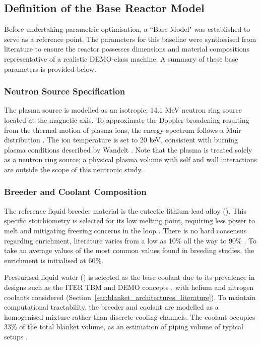 \documentclass[12pt]{article}
\begin{document}
\subsection{Definition of the Base Reactor Model}

Before undertaking parametric optimisation, a ``Base Model" was established to serve as a reference
point. The parameters for this baseline were synthesised from literature to ensure the reactor
possesses dimensions and material compositions representative of a realistic DEMO-class machine. A
summary of these base parameters is provided below.

\subsubsection{Neutron Source Specification}
The plasma source is modelled as an isotropic, 14.1 MeV neutron ring source located at the magnetic
axis. To approximate the Doppler broadening resulting from the thermal motion of plasma ions, the
energy spectrum follows a Muir distribution \cite{muir_sensitivity_1974}. The ion temperature is set
to 20 keV, consistent with burning plasma conditions described by Wandelt
\cite{wandelt_encyclopedia_2018}. Note that the plasma is treated solely as a neutron ring source; a
physical plasma volume with self and wall interactions are outside the scope of this neutronic
study.

\subsubsection{Breeder and Coolant Composition}
\label{sec:base_compositions}
The reference liquid breeder material is the eutectic lithium-lead alloy (). This
specific stoichiometry is selected for its low melting point, requiring less power to melt and
mitigating freezing concerns in the loop \cite{mas_de_les_valls_leadlithium_2008}. There is no hard
consensus regarding  enrichment, literature varies from a low as 10\% all the way to 90\%
\cite{hernandez_first_2018,boullon_molten_2021,segantin_optimisation_2020,segantin_neutronic_2020,kurasawa_ceramic_1995}.
To take an average values of the most common values found in breeding studies, the 
enrichment is initialised at 60\%.

Pressurised liquid water () is selected as the base coolant due to its prevalence in
designs such as the ITER TBM and DEMO concepts \cite{hirose_functional_2024}, with helium and
nitrogen coolants considered (Section~\ref{sec:blanket_architectures_literature}). To maintain
computational tractability, the breeder and coolant are modelled as a homogenised mixture rather
than discrete cooling channels. The coolant occupies 33\% of the total blanket volume, as an
estimation of piping volume of typical setups \cite{wang_current_2019}.
\end{document}
